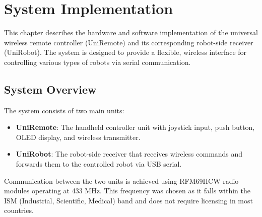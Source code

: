 
\chapter{System Implementation}
\label{chap:implementation}

This chapter describes the hardware and software implementation of the universal wireless remote controller (UniRemote) and its corresponding robot-side receiver (UniRobot). The system is designed to provide a flexible, wireless interface for controlling various types of robots via serial communication.

\section{System Overview}

The system consists of two main units:

\begin{itemize}
    \item \textbf{UniRemote}: The handheld controller unit with joystick input, push button, OLED display, and wireless transmitter.
    \item \textbf{UniRobot}: The robot-side receiver that receives wireless commands and forwards them to the controlled robot via USB serial.
\end{itemize}

Communication between the two units is achieved using RFM69HCW radio modules operating at 433 MHz. This frequency was chosen as it falls within the ISM (Industrial, Scientific, Medical) band and does not require licensing in most countries.

